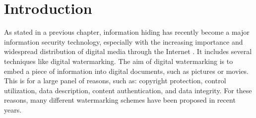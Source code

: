 %
%


\section{Introduction}

As stated in a previous chapter, information hiding has recently become a major information security technology, 
especially with the increasing importance and widespread distribution of digital media 
through the Internet \cite{Wu2007bis}. It includes several techniques like digital watermarking. 
The aim of digital watermarking is to embed a piece of information into digital documents, such as pictures 
or movies. This is for a large panel of reasons, such as: copyright protection, control utilization, data description,
content authentication, and data integrity. For these reasons, many different watermarking schemes have been proposed in 
recent years. 


